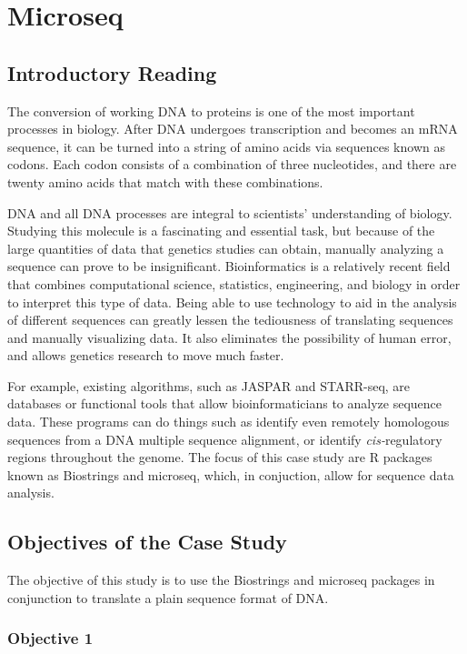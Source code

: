 \chapter{Microseq}
\section{Introductory Reading}


The conversion of working DNA to proteins is one of the most important processes in biology.
After DNA undergoes transcription and becomes an mRNA sequence, it can be turned into a string of amino acids via sequences known as codons.
Each codon consists of a combination of three nucleotides, and there are twenty amino acids that match with these combinations.

DNA and all DNA processes are integral to scientists' understanding of biology.
Studying this molecule is a fascinating and essential task, but because of the large quantities of data that genetics studies can obtain, manually analyzing a sequence can prove to be insignificant.
Bioinformatics is a relatively recent field that combines computational science, statistics, engineering, and biology in order to interpret this type of data.
Being able to use technology to aid in the analysis of different sequences can greatly lessen the tediousness of translating sequences and manually visualizing data.
It also eliminates the possibility of human error, and allows genetics research to move much faster.

For example, existing algorithms, such as JASPAR and STARR-seq, are databases or functional tools that allow bioinformaticians to analyze sequence data.
These programs can do things such as identify even remotely homologous sequences from a DNA multiple sequence alignment, or identify \textit{cis-}regulatory regions throughout the genome.\cite{jaspar} 
The focus of this case study are R packages known as Biostrings and microseq, which, in conjuction, allow for sequence data analysis. 

\section{Objectives of the Case Study}

The objective of this study is to use the Biostrings and microseq packages in conjunction to translate a plain sequence format of DNA.

\subsection{Objective 1}

